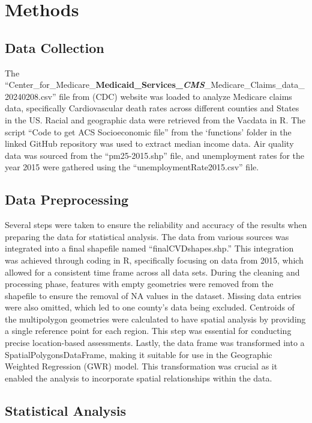 \documentclass[
]{article}
\begin{document}
\section{Methods}\label{methods}

\subsection{Data Collection}\label{data-collection}

The
``Center\_for\_Medicare\_\textbf{Medicaid\_Services\_\emph{CMS}}\_Medicare\_Claims\_data\_20240208.csv''
file from (CDC) website was loaded to analyze Medicare claims data,
specifically Cardiovascular death rates across different counties and
States in the US. Racial and geographic data were retrieved from the
Vacdata in R. The script ``Code to get ACS Socioeconomic file'' from the
`functions' folder in the linked GitHub repository was used to extract
median income data. Air quality data was sourced from the
``pm25-2015.shp'' file, and unemployment rates for the year 2015 were
gathered using the ``unemploymentRate2015.csv'' file.

\subsection{Data Preprocessing}\label{data-preprocessing}

Several steps were taken to ensure the reliability and accuracy of the
results when preparing the data for statistical analysis. The data from
various sources was integrated into a final shapefile named
``finalCVDshapes.shp.'' This integration was achieved through coding in
R, specifically focusing on data from 2015, which allowed for a
consistent time frame across all data sets. During the cleaning and
processing phase, features with empty geometries were removed from the
shapefile to ensure the removal of NA values in the dataset. Missing
data entries were also omitted, which led to one county's data being
excluded. Centroids of the multipolygon geometries were calculated to
have spatial analysis by providing a single reference point for each
region. This step was essential for conducting precise location-based
assessments. Lastly, the data frame was transformed into a
SpatialPolygonsDataFrame, making it suitable for use in the Geographic
Weighted Regression (GWR) model. This transformation was crucial as it
enabled the analysis to incorporate spatial relationships within the
data.

\subsection{Statistical Analysis}\label{statistical-analysis}
\end{document}
